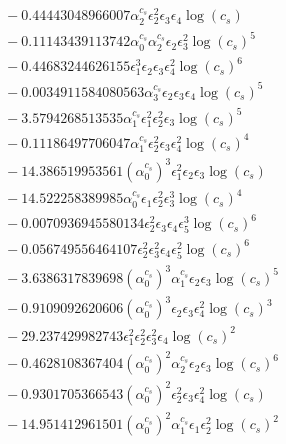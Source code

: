 \documentclass[10pt]{article}
\begin{document}
\begin{align*}
&{}  - 0.44443048966007 \alpha_{2}^{c_s} \epsilon_{2}^{2} \epsilon_{3} \epsilon_{4} \log{\left(c_{s} \right)} \\
&{}  - 0.11143439113742 \alpha_{0}^{c_s} \alpha_{2}^{c_s} \epsilon_{2} \epsilon_{3}^{2} \log{\left(c_{s} \right)}^{5} \\
&{}  - 0.44683244626155 \epsilon_{1}^{3} \epsilon_{2} \epsilon_{3} \epsilon_{4}^{2} \log{\left(c_{s} \right)}^{6} \\
&{}  - 0.0034911584080563 \alpha_{3}^{c_s} \epsilon_{2} \epsilon_{3} \epsilon_{4} \log{\left(c_{s} \right)}^{5} \\
&{}  - 3.5794268513535 \alpha_{1}^{c_s} \epsilon_{1}^{2} \epsilon_{2}^{2} \epsilon_{3} \log{\left(c_{s} \right)}^{5} \\
&{}  - 0.11186497706047 \alpha_{1}^{c_s} \epsilon_{2}^{2} \epsilon_{3} \epsilon_{4}^{2} \log{\left(c_{s} \right)}^{4} \\
&{}  - 14.386519953561 \left(\alpha_{0}^{c_s}\right)^{3} \epsilon_{1}^{2} \epsilon_{2} \epsilon_{3} \log{\left(c_{s} \right)} \\
&{}  - 14.522258389985 \alpha_{0}^{c_s} \epsilon_{1} \epsilon_{2}^{2} \epsilon_{3}^{3} \log{\left(c_{s} \right)}^{4} \\
&{}  - 0.0070936945580134 \epsilon_{2}^{2} \epsilon_{3} \epsilon_{4} \epsilon_{5}^{3} \log{\left(c_{s} \right)}^{6} \\
&{}  - 0.056749556464107 \epsilon_{2}^{2} \epsilon_{3}^{2} \epsilon_{4} \epsilon_{5}^{2} \log{\left(c_{s} \right)}^{6} \\
&{}  - 3.6386317839698 \left(\alpha_{0}^{c_s}\right)^{3} \alpha_{1}^{c_s} \epsilon_{2} \epsilon_{3} \log{\left(c_{s} \right)}^{5} \\
&{}  - 0.9109092620606 \left(\alpha_{0}^{c_s}\right)^{3} \epsilon_{2} \epsilon_{3} \epsilon_{4}^{2} \log{\left(c_{s} \right)}^{3} \\
&{}  - 29.237429982743 \epsilon_{1}^{2} \epsilon_{2}^{2} \epsilon_{3}^{2} \epsilon_{4} \log{\left(c_{s} \right)}^{2} \\
&{}  - 0.4628108367404 \left(\alpha_{0}^{c_s}\right)^{2} \alpha_{2}^{c_s} \epsilon_{2} \epsilon_{3} \log{\left(c_{s} \right)}^{6} \\
&{}  - 0.9301705366543 \left(\alpha_{0}^{c_s}\right)^{2} \epsilon_{2}^{2} \epsilon_{3} \epsilon_{4}^{2} \log{\left(c_{s} \right)} \\
&{}  - 14.951412961501 \left(\alpha_{0}^{c_s}\right)^{2} \alpha_{1}^{c_s} \epsilon_{1} \epsilon_{2}^{2} \log{\left(c_{s} \right)}^{2} \\

\end{align*}
\end{document}

